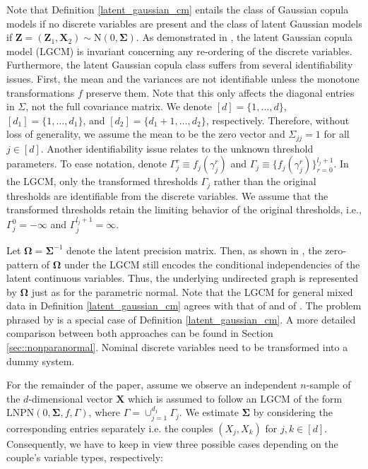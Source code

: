 Note that Definition \ref{latent_gaussian_cm} entails the class of Gaussian copula models if no discrete variables are present and the class of latent Gaussian models if $\mathbf{Z} = (\mathbf{Z}_1, \mathbf{X}_2) \sim \text{N}(0, \mathbf{\Sigma})$. As demonstrated in \cite{Fan17}, the latent Gaussian copula model (LGCM) is invariant concerning any re-ordering of the discrete variables. Furthermore, the latent Gaussian copula class suffers from several identifiability issues. First, the mean and the variances are not identifiable unless the monotone transformations \(f\) preserve them. Note that this only affects the diagonal entries in \(\Sigma\), not the full covariance matrix. We denote \([d] = \{1,\dots,d\}\), \([d_1] = \{1,\dots,d_1\}\), and \([d_2] = \{d_1 +1, \dots, d_2\}\), respectively. Therefore, without loss of generality, we assume the mean to be the zero vector and \(\Sigma_{jj} = 1\) for all \(j \in [d]\). Another identifiability issue relates to the unknown threshold parameters. To ease notation, denote \(\Gamma_j^r \equiv f_j(\gamma_j^r)\) and \(\Gamma_j \equiv \{f_j(\gamma_j^r)\}_{r=0}^{l_j+1}\). In the LGCM, only the transformed thresholds \(\Gamma_j\) rather than the original thresholds are identifiable from the discrete variables. We assume that the transformed thresholds retain the limiting behavior of the original thresholds, i.e., \(\Gamma_{j}^{0} = -\infty\) and \(\Gamma_j^{l_j+1} = \infty\).

Let $\mathbf{\Omega}= \mathbf{\Sigma}^{-1}$ denote the latent precision matrix. Then, as shown in \citet{Liu09}, the zero-pattern of $\mathbf{\Omega}$ under the LGCM still encodes the conditional independencies of the latent continuous variables. Thus, the underlying undirected graph is represented by $\mathbf{\Omega}$ just as for the parametric normal. Note that the LGCM for general mixed data in Definition \ref{latent_gaussian_cm} agrees with that of \citet{Quan18} and of \citet{Feng19}. The problem phrased by \citet{Fan17} is a special case of  Definition \ref{latent_gaussian_cm}. A more detailed comparison between both approaches can be found in Section \ref{sec::nonparanormal}. Nominal discrete variables need to be transformed into a dummy system.

For the remainder of the paper, assume we observe an independent $n$-sample of the $d$-dimensional vector $\mathbf{X}$ which is assumed to follow an LGCM of the form \(\text{LNPN}(0, \mathbf{\Sigma}, f, \Gamma)\), where \(\Gamma = \cup_{j=1}^{d_1}\Gamma_j\). We estimate $\mathbf{\Sigma}$ by considering the corresponding entries separately i.e. the couples $(X_j, X_k)$ for \(j,k \in [d]\). Consequently, we have to keep in view three possible cases depending on the couple's variable types, respectively:

